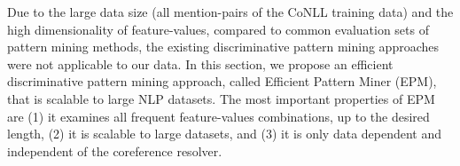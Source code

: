 Due to the large data size (all mention-pairs of the CoNLL training data)
and the high dimensionality of 
feature-values, compared to common evaluation sets of pattern mining methods, 
the existing discriminative pattern mining approaches were not applicable to our data.
In this section, we propose an efficient discriminative pattern mining approach, called Efficient Pattern Miner (EPM), that is scalable to large NLP datasets. 
The most important properties of EPM are (1) it examines all frequent feature-values combinations, up to the desired length, 
(2) it is scalable to large datasets, and (3) it is only data dependent and independent of the coreference resolver.
%
